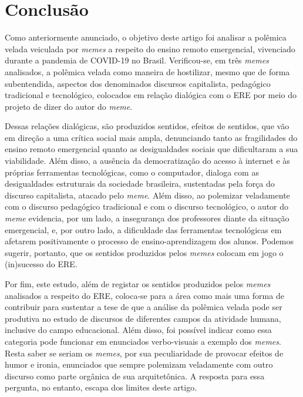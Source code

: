 \documentclass[portuguese]{textolivre}
\begin{document}
	
	
\section{Conclusão}\label{sec-conclusão}
	
Como anteriormente anunciado, o objetivo deste artigo foi analisar a polêmica velada veiculada por \textit{memes} a respeito do ensino remoto emergencial, vivenciado durante a pandemia de COVID-19 no Brasil. Verificou-se, em três \textit{memes} analisados, a polêmica velada como maneira de hostilizar, mesmo que de forma subentendida, aspectos dos denominados discursos capitalista, pedagógico tradicional e tecnológico, colocados em relação dialógica com o ERE por meio do projeto de dizer do autor do \textit{meme}.
	
Dessas relações dialógicas, são produzidos sentidos, efeitos de sentidos, que vão em direção a uma crítica social mais ampla, denunciando tanto as fragilidades do ensino remoto emergencial quanto as desigualdades sociais que dificultaram a sua viabilidade. Além disso, a ausência da democratização do acesso à internet e às próprias ferramentas tecnológicas, como o computador, dialoga com as desigualdades estruturais da sociedade brasileira, sustentadas pela força do discurso capitalista, atacado pelo \textit{meme}. Além disso, ao polemizar veladamente com o discurso pedagógico tradicional e com o discurso tecnológico, o autor do \textit{meme} evidencia, por um lado, a insegurança dos professores diante da situação emergencial, e, por outro lado, a dificuldade das ferramentas tecnológicas em afetarem positivamente o processo de ensino-aprendizagem dos alunos. Podemos sugerir, portanto, que os sentidos produzidos pelos \textit{memes} colocam em jogo o (in)sucesso do ERE.
	
Por fim, este estudo, além de registar os sentidos produzidos pelos \textit{memes} analisados a respeito do ERE, coloca-se para a área como mais uma forma de contribuir para sustentar a tese de que a análise da polêmica velada pode ser produtiva no estudo de discursos de diferentes campos da atividade humana, inclusive do campo educacional. Além disso, foi possível indicar como essa categoria pode funcionar em enunciados verbo-visuais a exemplo dos \textit{memes}. Resta saber se seriam os \textit{memes}, por sua peculiaridade de provocar efeitos de humor e ironia, enunciados que sempre polemizam veladamente com outro discurso como parte orgânica de sua arquitetônica. A resposta para essa pergunta, no entanto, escapa dos limites deste artigo.
	
\printbibliography
	
\end{document}
